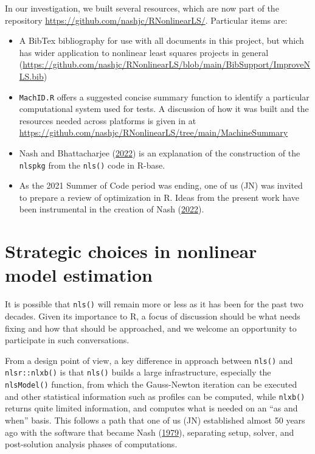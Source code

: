 \documentclass[
]{article}
\begin{document}
In our investigation, we built several resources, which are now part of
the repository \url{https://github.com/nashjc/RNonlinearLS/}. Particular
items are:

\begin{itemize}
\item
  A BibTex bibliography for use with all documents in this project, but
  which has wider application to nonlinear least squares projects in
  general
  (\url{https://github.com/nashjc/RNonlinearLS/blob/main/BibSupport/ImproveNLS.bib})
\item
  \texttt{MachID.R} offers a suggested concise summary function to
  identify a particular computational system used for tests. A
  discussion of how it was built and the resources needed across
  platforms is given in at
  \url{https://github.com/nashjc/RNonlinearLS/tree/main/MachineSummary}
\item
  Nash and Bhattacharjee (\protect\hyperlink{ref-PkgFromRbase22}{2022})
  is an explanation of the construction of the \texttt{nlspkg} from the
  \texttt{nls()} code in R-base.
\item
  As the 2021 Summer of Code period was ending, one of us (JN) was
  invited to prepare a review of optimization in R. Ideas from the
  present work have been instrumental in the creation of Nash
  (\protect\hyperlink{ref-NashWires22}{2022}).
\end{itemize}

\hypertarget{strategic-choices-in-nonlinear-model-estimation}{%
\section{Strategic choices in nonlinear model
estimation}\label{strategic-choices-in-nonlinear-model-estimation}}

It is possible that \texttt{nls()} will remain more or less as it has
been for the past two decades. Given its importance to R, a focus of
discussion should be what needs fixing and how that should be
approached, and we welcome an opportunity to participate in such
conversations.

From a design point of view, a key difference in approach between
\texttt{nls()} and \texttt{nlsr::nlxb()} is that \texttt{nls()} builds a
large infrastructure, especially the \texttt{nlsModel()} function, from
which the Gauss-Newton iteration can be executed and other statistical
information such as profiles can be computed, while \texttt{nlxb()}
returns quite limited information, and computes what is needed on an
``as and when'' basis. This follows a path that one of us (JN)
established almost 50 years ago with the software that became Nash
(\protect\hyperlink{ref-cnm79}{1979}), separating setup, solver, and
post-solution analysis phases of computations.
\end{document}
